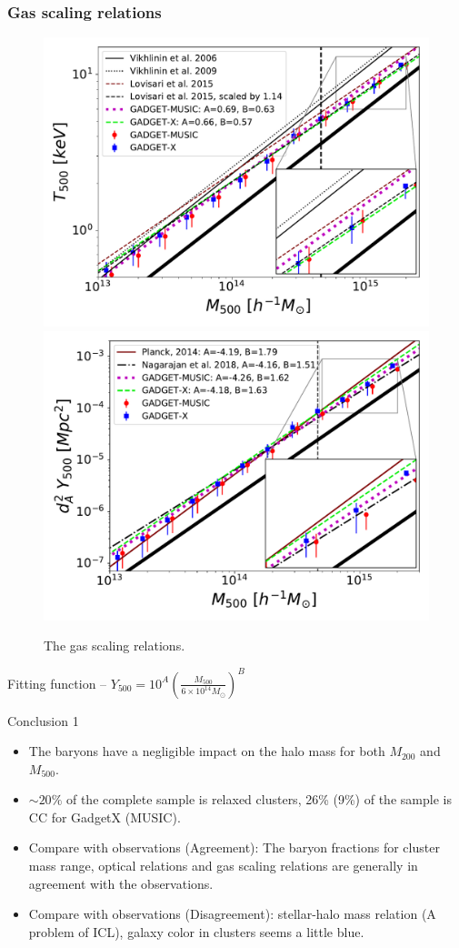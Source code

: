 \documentclass[aspectratio=43]{beamer}
\begin{document}
\begin{frame}
  \frametitle{Gas scaling relations}
  \begin{figure}
    \includegraphics[width=0.48\linewidth]{T-M-relations}
    \includegraphics[width=0.48\linewidth]{YM_relation-full.pdf}
    \vspace{-0.4cm}
    \caption{The gas scaling relations.}
  \end{figure}

\begin{center}
  Fitting function -- $Y_{500} = 10^A (\frac{M_{500}}{6\times10^{14} M_{\odot}})^B$
\end{center}
\end{frame}

\begin{frame}{Conclusion 1}
  {
  \begin{itemize}
    \item The baryons have a negligible impact on the halo mass for both $M_{200}$ and $M_{500}$.
    \item $\sim 20 \%$ of the complete sample is relaxed clusters, 26\% (9\%) of the sample is CC for GadgetX (MUSIC).
    \item Compare with observations (Agreement): The baryon fractions for cluster mass range, optical relations and gas scaling relations are generally in agreement with the observations.
    \item Compare with observations (Disagreement):  stellar-halo mass relation (A problem of ICL), galaxy color in clusters seems a little blue.
  \end{itemize}}
  \begin{center}
    \hyperlink{lastpage}{}    
  \end{center}
\end{frame}
\end{document}
